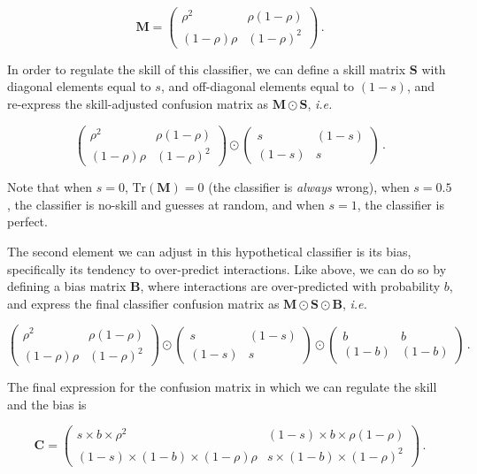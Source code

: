 \documentclass[10pt,oneside]{article}
\begin{document}
\[
\mathbf{M} = \begin{pmatrix}
    \rho^2 & \rho (1-\rho) \\
    (1-\rho) \rho & (1-\rho)^2
\end{pmatrix} \,.
\]

In order to regulate the skill of this classifier, we can define a skill
matrix \(\mathbf{S}\) with diagonal elements equal to \(s\), and
off-diagonal elements equal to \((1-s)\), and re-express the
skill-adjusted confusion matrix as \(\mathbf{M} \odot \mathbf{S}\),
\emph{i.e.}

\[
\begin{pmatrix}
    \rho^2 & \rho (1-\rho) \\
    (1-\rho) \rho & (1-\rho)^2
\end{pmatrix} \odot \begin{pmatrix}
    s & (1-s) \\
    (1-s) & s
\end{pmatrix} \,.
\]

Note that when \(s=0\), \(\text{Tr}(\mathbf{M}) = 0\) (the classifier is
\emph{always} wrong), when \(s=0.5\), the classifier is no-skill and
guesses at random, and when \(s=1\), the classifier is perfect.

The second element we can adjust in this hypothetical classifier is its
bias, specifically its tendency to over-predict interactions. Like
above, we can do so by defining a bias matrix \(\mathbf{B}\), where
interactions are over-predicted with probability \(b\), and express the
final classifier confusion matrix as
\(\mathbf{M}\odot \mathbf{S}\odot \mathbf{B}\), \emph{i.e.}

\[
\begin{pmatrix}
    \rho^2 & \rho (1-\rho) \\
    (1-\rho) \rho & (1-\rho)^2
\end{pmatrix} \odot \begin{pmatrix}
    s & (1-s) \\
    (1-s) & s
\end{pmatrix} \odot \begin{pmatrix}
    b & b \\
    (1-b) & (1-b)
\end{pmatrix}\,.
\]

The final expression for the confusion matrix in which we can regulate
the skill and the bias is

\[
\mathbf{C} = \begin{pmatrix}
    s\times b\times \rho^2 & (1-s)\times b\times \rho (1-\rho) \\
    (1-s)\times (1-b)\times (1-\rho) \rho & s\times (1-b)\times (1-\rho)^2
\end{pmatrix} \,.
\]
\end{document}
